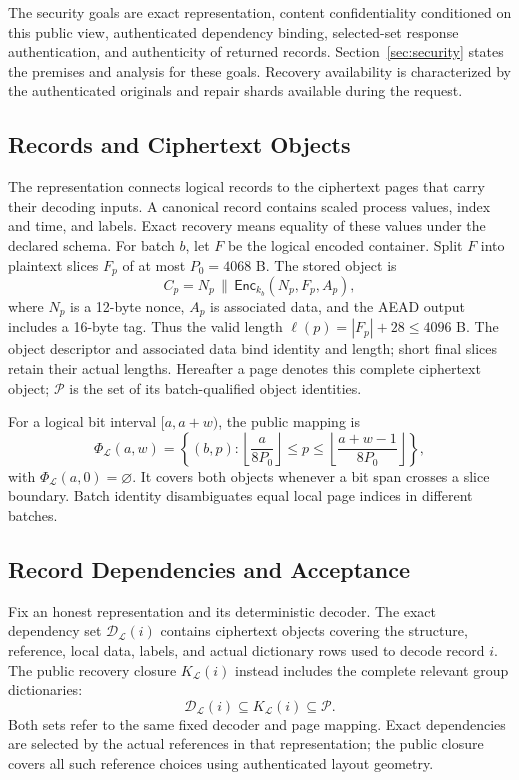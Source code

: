 \documentclass[10pt,journal]{IEEEtran}
\begin{document}
The security goals are exact representation, content confidentiality
conditioned on this public view, authenticated dependency binding,
selected-set response authentication, and authenticity of returned records.
Section~\ref{sec:security} states the premises and analysis for these goals.
Recovery availability is characterized by
the authenticated originals and repair shards available during the request.

\subsection{Records and Ciphertext Objects}
The representation connects logical records to the ciphertext pages that
carry their decoding inputs. A canonical record contains scaled process values, index and time, and
labels. Exact recovery means equality of these values under the declared
schema. For batch $b$, let $F$ be the logical encoded container. Split $F$
into plaintext slices $F_p$ of at most $P_0=4068$ B. The stored object is
\begin{equation}\label{eq:cipher}
C_p=N_p\,\|\,\mathsf{Enc}_{k_b}(N_p,F_p,A_p),
\end{equation}
where $N_p$ is a 12-byte nonce, $A_p$ is associated data, and the AEAD
output includes a 16-byte tag. Thus the valid length
$\ell(p)=|F_p|+28\leq4096$ B. The object descriptor and associated data
bind identity and length; short final slices retain their actual lengths.
Hereafter a page denotes this complete ciphertext object; $\mathcal P$ is the set of its batch-qualified object identities.

For a logical bit interval $[a,a+w)$, the public mapping is
\begin{equation}\label{eq:phi}
\Phi_{\mathcal L}(a,w)=
\left\{(b,p):\left\lfloor\frac{a}{8P_0}\right\rfloor
\leq p\leq\left\lfloor\frac{a+w-1}{8P_0}\right\rfloor\right\},
\end{equation}
with $\Phi_{\mathcal L}(a,0)=\varnothing$. It covers both objects whenever
a bit span crosses a slice boundary. Batch identity disambiguates equal
local page indices in different batches.

\subsection{Record Dependencies and Acceptance}
Fix an honest representation and its deterministic decoder. The exact
dependency set $\mathcal D_{\mathcal L}(i)$ contains ciphertext objects
covering the structure, reference, local data, labels, and actual dictionary
rows used to decode record $i$. The public recovery closure
$K_{\mathcal L}(i)$ instead includes the complete relevant group dictionaries:
\begin{equation}\label{eq:sufficient-set}
\mathcal D_{\mathcal L}(i)\subseteq K_{\mathcal L}(i)\subseteq\mathcal P.
\end{equation}
Both sets refer to the same fixed decoder and page mapping. Exact dependencies
are selected by the actual references in that representation; the public
closure covers all such reference choices using authenticated layout geometry.
\end{document}
